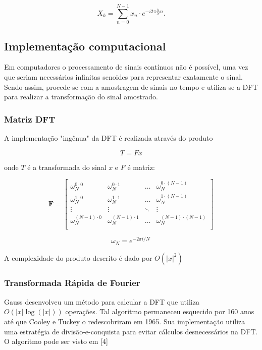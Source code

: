 \documentclass[brazil,times]{abnt}
\begin{document}
		$$X_k = \sum_{n=0}^{N-1} x_n \cdot e^{-i 2 \pi \frac{k}{N} n}.$$


	\subsection*{Implementação computacional}
		Em computadores o processamento de sinais contínuos não é possível, uma vez que seriam necessários infinitas senoides para representar exatamente o sinal. Sendo assim, procede-se com a amostragem de sinais no tempo e utiliza-se a DFT para realizar a transformação do sinal amostrado.

		\subsubsection*{Matriz DFT}
			A implementação "ingênua" da DFT é realizada através do produto

			$$ T = Fx$$

			onde $T$ é a transformada do sinal $x$ e $F$ é matriz:

			$$
			\mathbf{F} =
			\begin{bmatrix}
				\omega_N^{0 \cdot 0}     & \omega_N^{0 \cdot 1}     & \ldots & \omega_N^{0 \cdot (N-1)}     \\
				\omega_N^{1 \cdot 0}     & \omega_N^{1 \cdot 1}     & \ldots & \omega_N^{1 \cdot (N-1)}     \\
				\vdots                   & \vdots                   & \ddots & \vdots                       \\
				\omega_N^{(N-1) \cdot 0} & \omega_N^{(N-1) \cdot 1} & \ldots & \omega_N^{(N-1) \cdot (N-1)} \\
			\end{bmatrix}
			$$

			$$\omega_N = e^{-2 \pi i/N}\,$$

			A complexidade do produto descrito é dado por $O(|x|^2)$

		\subsubsection*{Transformada Rápida de Fourier}
			Gauss desenvolveu um método para calcular a DFT que utiliza $O(|x|\log(|x|))$ operações. Tal algoritmo permaneceu esquecido por 160 anos até que Cooley e Tuckey o redescobriram em 1965. Sua implementação utiliza uma estratégia de divisão-e-conquista para evitar cálculos desnecessários na DFT. O algoritmo pode ser visto em [4]
\end{document}
